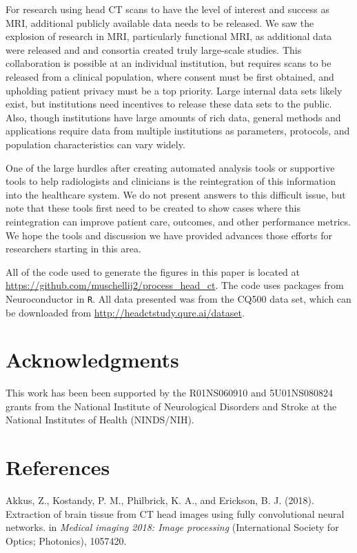 \documentclass[utf8]{frontiersSCNS}
\begin{document}
For research using head CT scans to have the level of interest and success as MRI, additional publicly available data needs to be released. We saw the explosion of research in MRI, particularly functional MRI, as additional data were released and and consortia created truly large-scale studies. This collaboration is possible at an individual institution, but requires scans to be released from a clinical population, where consent must be first obtained, and upholding patient privacy must be a top priority. Large internal data sets likely exist, but institutions need incentives to release these data sets to the public. Also, though institutions have large amounts of rich data, general methods and applications require data from multiple institutions as parameters, protocols, and population characteristics can vary widely.

One of the large hurdles after creating automated analysis tools or supportive tools to help radiologists and clinicians is the reintegration of this information into the healthcare system. We do not present answers to this difficult issue, but note that these tools first need to be created to show cases where this reintegration can improve patient care, outcomes, and other performance metrics. We hope the tools and discussion we have provided advances those efforts for researchers starting in this area.

All of the code used to generate the figures in this paper is located at \url{https://github.com/muschellij2/process_head_ct}. The code uses packages from Neuroconductor in \texttt{R}. All data presented was from the CQ500 data set, which can be downloaded from \url{http://headctstudy.qure.ai/dataset}.

\hypertarget{acknowledgments}{%
\section{Acknowledgments}\label{acknowledgments}}

This work has been been supported by the R01NS060910 and 5U01NS080824 grants from the National Institute of Neurological Disorders and Stroke at the National Institutes of Health (NINDS/NIH).

\hypertarget{references}{%
\section*{References}\label{references}}

\hypertarget{refs}{}
\leavevmode\hypertarget{ref-ct_bet}{}%
Akkus, Z., Kostandy, P. M., Philbrick, K. A., and Erickson, B. J. (2018). Extraction of brain tissue from CT head images using fully convolutional neural networks. in \emph{Medical imaging 2018: Image processing} (International Society for Optics; Photonics), 1057420.
\end{document}
